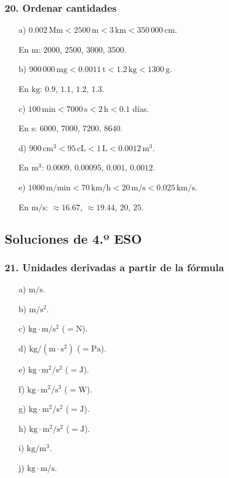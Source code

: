 \subsubsection*{20. Ordenar cantidades}
\begin{enumerate}
    \item[a)]
    $0.002\,\mathrm{Mm}<2500\,\mathrm{m}<3\,\mathrm{km}
    <350\,000\,\mathrm{cm}$.

    En $\mathrm{m}$: $2000$, $2500$, $3000$, $3500$.

    \item[b)]
    $900\,000\,\mathrm{mg}<0.0011\,\mathrm{t}<1.2\,\mathrm{kg}
    <1300\,\mathrm{g}$.

    En $\mathrm{kg}$: $0.9$, $1.1$, $1.2$, $1.3$.

    \item[c)]
    $100\,\mathrm{min}<7000\,\mathrm{s}<2\,\mathrm{h}<0.1$ días.

    En $\mathrm{s}$: $6000$, $7000$, $7200$, $8640$.

    \item[d)]
    $900\,\mathrm{cm^3}<95\,\mathrm{cL}<1\,\mathrm{L}
    <0.0012\,\mathrm{m^3}$.

    En $\mathrm{m^3}$: $0.0009$, $0.00095$, $0.001$, $0.0012$.

    \item[e)]
    $1000\,\mathrm{m/min}<70\,\mathrm{km/h}<20\,\mathrm{m/s}
    <0.025\,\mathrm{km/s}$.

    En $\mathrm{m/s}$: $\approx16.67$, $\approx19.44$, $20$, $25$.
\end{enumerate}

\subsection{Soluciones de 4.º ESO}

\subsubsection*{21. Unidades derivadas a partir de la fórmula}
\begin{enumerate}
    \item[a)] $\mathrm{m/s}$.
    \item[b)] $\mathrm{m/s^2}$.
    \item[c)] $\mathrm{kg\cdot m/s^2}$ ($=\mathrm{N}$).
    \item[d)] $\mathrm{kg/(m\cdot s^2)}$ ($=\mathrm{Pa}$).
    \item[e)] $\mathrm{kg\cdot m^2/s^2}$ ($=\mathrm{J}$).
    \item[f)] $\mathrm{kg\cdot m^2/s^3}$ ($=\mathrm{W}$).
    \item[g)] $\mathrm{kg\cdot m^2/s^2}$ ($=\mathrm{J}$).
    \item[h)] $\mathrm{kg\cdot m^2/s^2}$ ($=\mathrm{J}$).
    \item[i)] $\mathrm{kg/m^3}$.
    \item[j)] $\mathrm{kg\cdot m/s}$.
\end{enumerate}

